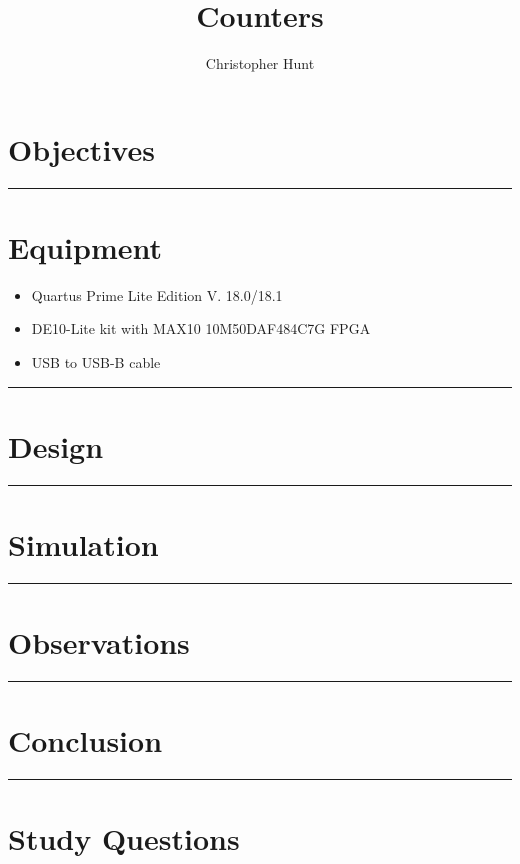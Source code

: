\documentclass{article}
\title{\textbf{{\huge Counters}}}
\author{Christopher Hunt}
\date{}
\begin{document}
\pagestyle{fancy}
\fancyhf{}
\rhead{\thepage}
\maketitle
\section*{\textcolor{mycolor}{Objectives}}

\vspace{5mm}
\hrule

\section*{\textcolor{mycolor}{Equipment}}
\begin{itemize}
  \item Quartus Prime Lite Edition V. 18.0/18.1
  \item DE10-Lite kit with MAX10 10M50DAF484C7G FPGA
  \item USB to USB-B cable
\end{itemize}
\vspace{5mm}
\hrule

\section*{\textcolor{mycolor}{Design}}
\vspace{5mm}
\hrule

\section*{\textcolor{mycolor}{Simulation}}

\vspace{5mm}
\hrule

\section*{\textcolor{mycolor}{Observations}}
\vspace{5mm}
\hrule

\section*{\textcolor{mycolor}{Conclusion}}

\vspace{5mm}
\hrule

\section*{\textcolor{mycolor}{Study Questions}}
\end{document}
